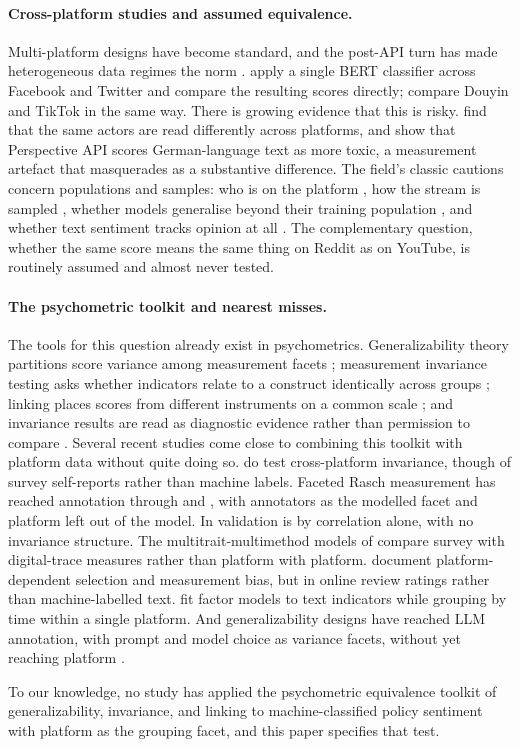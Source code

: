 \paragraph{Cross-platform studies and assumed equivalence.}
Multi-platform designs have become standard, and the post-API turn has made heterogeneous data regimes the norm \citep{davidson2023, goanta2026}. \citet{overgaard2024} apply a single BERT classifier across Facebook and Twitter and compare the resulting scores directly; \citet{wei2026} compare Douyin and TikTok in the same way. There is growing evidence that this is risky. \citet{greene2025} find that the same actors are read differently across platforms, and \citet{nogara2025} show that Perspective API scores German-language text as more toxic, a measurement artefact that masquerades as a substantive difference. The field's classic cautions concern populations and samples: who is on the platform \citep{tufekci2014}, how the stream is sampled \citep{morstatter2013}, whether models generalise beyond their training population \citep{cohen2013}, and whether text sentiment tracks opinion at all \citep{oconnor2010}. The complementary question, whether the same score means the same thing on Reddit as on YouTube, is routinely assumed and almost never tested.

\paragraph{The psychometric toolkit and nearest misses.}
The tools for this question already exist in psychometrics. Generalizability theory partitions score variance among measurement facets \citep{cronbach1972, brennan2001}; measurement invariance testing asks whether indicators relate to a construct identically across groups \citep{meredith1993, putnick2016}; linking places scores from different instruments on a common scale \citep{kolen2014}; and invariance results are read as diagnostic evidence rather than permission to compare \citep{robitzsch2023}. Several recent studies come close to combining this toolkit with platform data without quite doing so. \citet{boyd2024} do test cross-platform invariance, though of survey self-reports rather than machine labels. Faceted Rasch measurement has reached annotation through \citet{kennedy2020} and \citet{sachdeva2022}, with annotators as the modelled facet and platform left out of the model. In \citet{pellert2022} validation is by correlation alone, with no invariance structure. The multitrait-multimethod models of \citet{cernat2025} compare survey with digital-trace measures rather than platform with platform. \citet{han2025} document platform-dependent selection and measurement bias, but in online review ratings rather than machine-labelled text. \citet{pokropek2026} fit factor models to text indicators while grouping by time within a single platform. And generalizability designs have reached LLM annotation, with prompt and model choice as variance facets, without yet reaching platform \citep{camuffo2026}.

To our knowledge, no study has applied the psychometric equivalence toolkit of generalizability, invariance, and linking to machine-classified policy sentiment with platform as the grouping facet, and this paper specifies that test.
